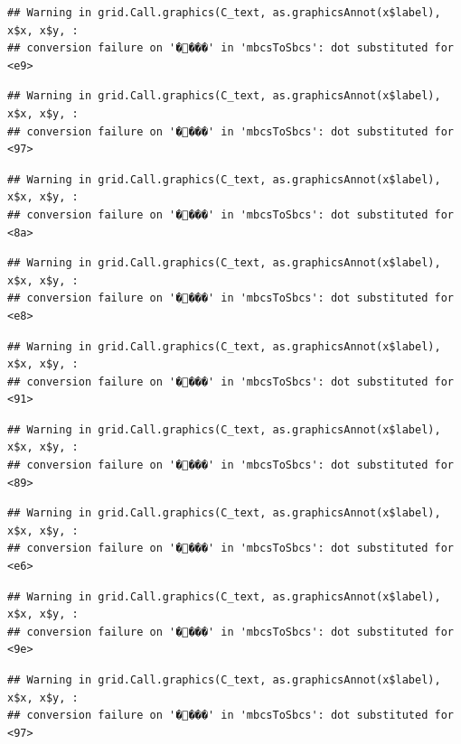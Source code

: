\documentclass[
]{article}
\begin{document}
\begin{verbatim}
## Warning in grid.Call.graphics(C_text, as.graphicsAnnot(x$label), x$x, x$y, :
## conversion failure on '����' in 'mbcsToSbcs': dot substituted for <e9>
\end{verbatim}

\begin{verbatim}
## Warning in grid.Call.graphics(C_text, as.graphicsAnnot(x$label), x$x, x$y, :
## conversion failure on '����' in 'mbcsToSbcs': dot substituted for <97>
\end{verbatim}

\begin{verbatim}
## Warning in grid.Call.graphics(C_text, as.graphicsAnnot(x$label), x$x, x$y, :
## conversion failure on '����' in 'mbcsToSbcs': dot substituted for <8a>
\end{verbatim}

\begin{verbatim}
## Warning in grid.Call.graphics(C_text, as.graphicsAnnot(x$label), x$x, x$y, :
## conversion failure on '����' in 'mbcsToSbcs': dot substituted for <e8>
\end{verbatim}

\begin{verbatim}
## Warning in grid.Call.graphics(C_text, as.graphicsAnnot(x$label), x$x, x$y, :
## conversion failure on '����' in 'mbcsToSbcs': dot substituted for <91>
\end{verbatim}

\begin{verbatim}
## Warning in grid.Call.graphics(C_text, as.graphicsAnnot(x$label), x$x, x$y, :
## conversion failure on '����' in 'mbcsToSbcs': dot substituted for <89>
\end{verbatim}

\begin{verbatim}
## Warning in grid.Call.graphics(C_text, as.graphicsAnnot(x$label), x$x, x$y, :
## conversion failure on '����' in 'mbcsToSbcs': dot substituted for <e6>
\end{verbatim}

\begin{verbatim}
## Warning in grid.Call.graphics(C_text, as.graphicsAnnot(x$label), x$x, x$y, :
## conversion failure on '����' in 'mbcsToSbcs': dot substituted for <9e>
\end{verbatim}

\begin{verbatim}
## Warning in grid.Call.graphics(C_text, as.graphicsAnnot(x$label), x$x, x$y, :
## conversion failure on '����' in 'mbcsToSbcs': dot substituted for <97>
\end{verbatim}
\end{document}

